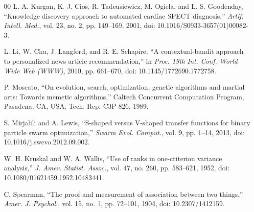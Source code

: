 \documentclass[journal]{IEEEtran}
\begin{document}
\begin{thebibliography}{00}
 L. A. Kurgan, K. J. Cios, R. Tadeusiewicz, M. Ogiela, and L. S. Goodenday, ``Knowledge discovery approach to automated cardiac SPECT diagnosis,'' \textit{Artif. Intell. Med.}, vol. 23, no. 2, pp. 149--169, 2001, doi: 10.1016/S0933-3657(01)00082-3.

 L. Li, W. Chu, J. Langford, and R. E. Schapire, ``A contextual-bandit approach to personalized news article recommendation,'' in \textit{Proc. 19th Int. Conf. World Wide Web (WWW)}, 2010, pp. 661--670, doi: 10.1145/1772690.1772758.

 P. Moscato, ``On evolution, search, optimization, genetic algorithms and martial arts: Towards memetic algorithms,'' Caltech Concurrent Computation Program, Pasadena, CA, USA, Tech. Rep. C3P 826, 1989.

 S. Mirjalili and A. Lewis, ``S-shaped versus V-shaped transfer functions for binary particle swarm optimization,'' \textit{Swarm Evol. Comput.}, vol. 9, pp. 1--14, 2013, doi: 10.1016/j.swevo.2012.09.002.

 W. H. Kruskal and W. A. Wallis, ``Use of ranks in one-criterion variance analysis,'' \textit{J. Amer. Statist. Assoc.}, vol. 47, no. 260, pp. 583--621, 1952, doi: 10.1080/01621459.1952.10483441.

 C. Spearman, ``The proof and measurement of association between two things,'' \textit{Amer. J. Psychol.}, vol. 15, no. 1, pp. 72--101, 1904, doi: 10.2307/1412159.

\end{thebibliography}
\end{document}
